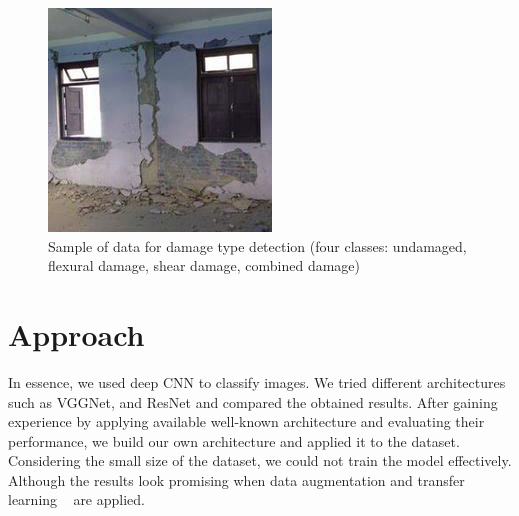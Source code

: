 \documentclass[10pt,twocolumn,letterpaper]{article}
\begin{document}
\begin{figure}[t]
\begin{center}
   \includegraphics[width=0.8\linewidth]{data0.png}
\end{center}
   \caption{Sample of data for damage type detection (four classes: undamaged, flexural damage, shear damage, combined damage)~\cite{Imagenet01}}
\label{fig:long1}
\end{figure}

\section{Approach}
In essence, we used deep CNN to classify images. We tried different architectures such as VGGNet, and ResNet and compared the obtained results. After gaining experience by applying available well-known architecture and evaluating their performance, we build our own architecture and applied it to the dataset. Considering the small size of the dataset, we could not train the model effectively. Although the results look promising when data augmentation and transfer learning ~\cite{ref03} are applied.  
\end{document}
